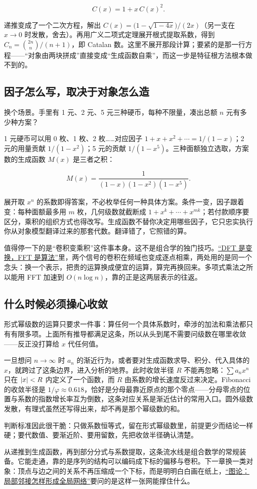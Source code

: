 \[
C(x)=1+x\,C(x)^{2}.
\]

递推变成了一个二次方程，解出 \(C(x)=\bigl(1-\sqrt{1-4x}\bigr)/(2x)\)（另一支在 \(x\to0\) 时发散，舍去）。再用广义二项式定理展开根式提取系数，得到 \(C_n=\binom{2n}{n}/(n+1)\)，即 Catalan 数。这里不展开那段计算；要紧的是那一行方程——``对象由两块拼成''直接变成``生成函数自乘''，而这一步是特征根方法根本做不到的。

\subsection{因子怎么写，取决于对象怎么造}

换个场景。手里有 1 元、2 元、5 元三种硬币，每种不限量，凑出总额 \(n\) 元有多少种方案？

1 元硬币可以用 0 枚、1 枚、2 枚……对应因子 \(1+x+x^{2}+\cdots=1/(1-x)\)；2 元的用量贡献 \(1/(1-x^{2})\)；5 元的贡献 \(1/(1-x^{5})\)。三种面额独立选取，方案数的生成函数 \(M(x)\) 是三者之积：

\[
M(x)=\frac{1}{(1-x)(1-x^{2})(1-x^{5})}.
\]

展开取 \(x^{n}\) 的系数即得答案，不必枚举任何一种具体方案。条件一变，因子跟着变：每种面额最多用 \(m\) 枚，几何级数就截断成 \(1+x^{k}+\cdots+x^{mk}\)；若付款顺序要区分，乘积的组织方式也得改写。生成函数不替你决定用哪些因子，它只忠实执行你从对象模型翻译过来的那套代数。翻译错了，它照错的算。

值得停一下的是``卷积变乘积''这件事本身。这不是组合学的独门技巧。\hyperref[sec:08-Numerical-Analysis/08-Fourier-and-Spectral-Methods/03]{``DFT 是变换，FFT 是算法''}里，两个信号的卷积在频域也变成逐点相乘，两处用的是同一个念头：换一个表示，把贵的运算换成便宜的运算，算完再换回来。多项式乘法之所以能用 FFT 加速到 \(O(n\log n)\)，靠的正是这两层表示的往返。

\subsection{什么时候必须操心收敛}

形式幂级数的运算只要求一件事：算任何一个具体系数时，牵涉的加法和乘法都只有有限多项。上面所有推导都满足这条，所以从头到尾不需要问级数在哪里收敛——反正没打算给 \(x\) 代任何值。

一旦想问 \(n\to\infty\) 时 \(a_n\) 的渐近行为，或者要对生成函数求导、积分、代入具体的 \(x\)，就跨过了这条边界，进入分析的地界。此时收敛半径 \(R\) 不能再忽略：\(\sum a_nx^{n}\) 只在 \(\left|x\right|<R\) 内定义了一个函数，而 \(R\) 由系数的增长速度反过来决定。Fibonacci 的收敛半径是 \(1/\varphi\approx0.618\)，恰好是分母最靠近原点的那个零点——分母零点的位置与系数的指数增长率互为倒数，这条对应关系是渐近估计的常用入口。圆外级数发散，有理式虽然还写得出来，却不再是那个幂级数的和。

判断标准因此很干脆：只做系数恒等式，留在形式幂级数里，前提更少而结论一样硬；要代数值、要渐近阶、要用留数，先把收敛半径确认清楚。

从递推到生成函数，再到部分分式与系数提取，这条流水线是组合数学的常规装备。它能走通，靠的是序列的结构可以编码成下标的偏移与卷积。下一章换一类对象：顶点与边之间的关系不再压缩成一个下标，而是明明白白画在纸上，\hyperref[ch:028]{``图论：局部邻接怎样形成全局网络''}要问的是这样一张网能撑住什么。
